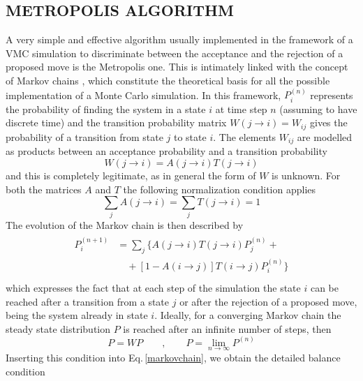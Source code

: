 \subsection{METROPOLIS ALGORITHM}
A very simple and effective algorithm usually implemented in the framework of a VMC simulation to discriminate between the acceptance and the rejection of a proposed move is the Metropolis one. This is intimately linked with the concept of Markov chains \cite{markov}, which constitute the theoretical basis for all the possible implementation of a Monte Carlo simulation. In this framework, $P_i^{(n)}$ represents the probability of finding the system in a state $i$ at time step $n$ (assuming to have discrete time) and the transition probability matrix $W(j \rightarrow i) = W_{ij}$ gives the probability of a transition from state $j$ to state $i$. The elements $W_{ij}$ are modelled as products between an acceptance probability and a transition probability
\begin{equation*}
    W(j\rightarrow i) = A(j\rightarrow i) T(j\rightarrow i)
\end{equation*}
and this is completely legitimate, as in general the form of $W$ is unknown. For both the matrices $A$ and $T$ the following normalization condition applies
\begin{equation*}
    \sum_j A(j\rightarrow i) = \sum_j T(j\rightarrow i) = 1
\end{equation*}
The evolution of the Markov chain is then described by
\begin{align}
\begin{split}
    P_i^{(n+1)} &= \sum_j \bigg\{ A(j\rightarrow i) T(j\rightarrow i) P_j^{(n)} + \\
    &\quad + \left[1 - A(i\rightarrow j) \right] T(i\rightarrow j) P_i^{(n)} \bigg\} \\
\end{split}
\label{markovchain}
\end{align}
which expresses the fact that at each step of the simulation the state $i$ can be reached after a transition from a state $j$ or after the rejection of a proposed move, being the system already in state $i$. Ideally, for a converging Markov chain the steady state distribution $P$ is reached after an infinite number of steps, then
\begin{equation*}
    P=WP \qquad, \qquad P = \lim_{n\rightarrow \infty} P^{(n)}
\end{equation*}
Inserting this condition into Eq.\,\ref{markovchain}, we obtain the detailed balance condition
